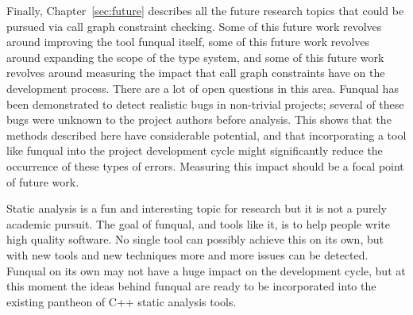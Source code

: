 Finally, Chapter~\ref{sec:future} describes all the future research topics that could be pursued via call graph constraint checking.  Some of this future work revolves around improving the tool funqual itself, some of this future work revolves around expanding the scope of the type system, and some of this future work revolves around measuring the impact that call graph constraints have on the development process.  There are a lot of open questions in this area.  Funqual has been demonstrated to detect realistic bugs in non-trivial projects; several of these bugs were unknown to the project authors before analysis.  This shows that the methods described here have considerable potential, and that incorporating a tool like funqual into the project development cycle might significantly reduce the occurrence of these types of errors.  Measuring this impact should be a focal point of future work.  

Static analysis is a fun and interesting topic for research but it is not a purely academic pursuit.  The goal of funqual, and tools like it, is to help people write high quality software.  No single tool can possibly achieve this on its own, but with new tools and new techniques more and more issues can be detected.  Funqual on its own may not have a huge impact on the development cycle, but at this moment the ideas behind funqual are ready to be incorporated into the existing pantheon of C++ static analysis tools.  


